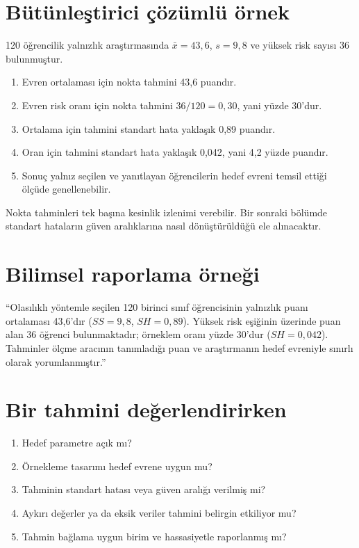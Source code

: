 \section{Bütünleştirici çözümlü örnek}

120 öğrencilik yalnızlık araştırmasında $\bar x=43{,}6$, $s=9{,}8$ ve yüksek
risk sayısı 36 bulunmuştur.

\begin{enumerate}
  \item Evren ortalaması için nokta tahmini 43,6 puandır.
  \item Evren risk oranı için nokta tahmini $36/120=0{,}30$, yani yüzde 30'dur.
  \item Ortalama için tahmini standart hata yaklaşık 0,89 puandır.
  \item Oran için tahmini standart hata yaklaşık 0,042, yani 4,2 yüzde puandır.
  \item Sonuç yalnız seçilen ve yanıtlayan öğrencilerin hedef evreni temsil ettiği ölçüde genellenebilir.
\end{enumerate}

Nokta tahminleri tek başına kesinlik izlenimi verebilir. Bir sonraki bölümde
standart hataların güven aralıklarına nasıl dönüştürüldüğü ele alınacaktır.

\section{Bilimsel raporlama örneği}

``Olasılıklı yöntemle seçilen 120 birinci sınıf öğrencisinin yalnızlık puanı
ortalaması 43,6'dır ($SS=9{,}8$, $SH=0{,}89$). Yüksek risk eşiğinin üzerinde
puan alan 36 öğrenci bulunmaktadır; örneklem oranı yüzde 30'dur
($SH=0{,}042$). Tahminler ölçme aracının tanımladığı puan ve araştırmanın hedef
evreniyle sınırlı olarak yorumlanmıştır.''

\section{Bir tahmini değerlendirirken}

\begin{enumerate}
  \item Hedef parametre açık mı?
  \item Örnekleme tasarımı hedef evrene uygun mu?
  \item Tahminin standart hatası veya güven aralığı verilmiş mi?
  \item Aykırı değerler ya da eksik veriler tahmini belirgin etkiliyor mu?
  \item Tahmin bağlama uygun birim ve hassasiyetle raporlanmış mı?
\end{enumerate}

